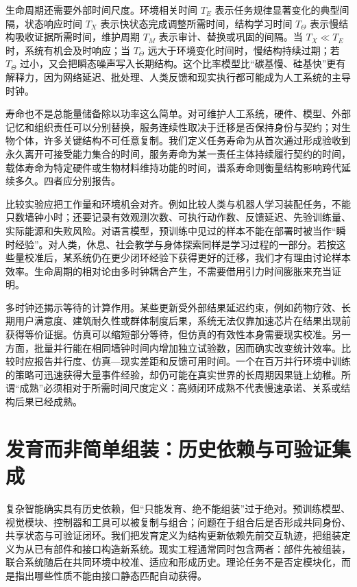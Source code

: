 生命周期还需要外部时间尺度。环境相关时间 $T_E$ 表示任务规律显著变化的典型间隔，状态响应时间 $T_X$ 表示快状态完成调整所需时间，结构学习时间 $T_\Theta$ 表示慢结构吸收证据所需时间，维护周期 $T_M$ 表示审计、替换或巩固的间隔。当 $T_X\ll T_E$ 时，系统有机会及时响应；当 $T_\Theta$ 远大于环境变化时间时，慢结构持续过期；若 $T_\Theta$ 过小，又会把瞬态噪声写入长期结构。这个比率模型比“碳基慢、硅基快”更有解释力，因为网络延迟、批处理、人类反馈和现实执行都可能成为人工系统的主导时钟。

寿命也不是总能量储备除以功率这么简单。对可维护人工系统，硬件、模型、外部记忆和组织责任可以分别替换，服务连续性取决于迁移是否保持身份与契约；对生物个体，许多关键结构不可任意复制。我们定义任务寿命为从首次通过形成验收到永久离开可接受能力集合的时间，服务寿命为某一责任主体持续履行契约的时间，载体寿命为特定硬件或生物材料维持功能的时间，谱系寿命则衡量结构影响跨代延续多久。四者应分别报告。

比较实验应把工作量和环境机会对齐。例如比较人类与机器人学习装配任务，不能只数墙钟小时；还要记录有效观测次数、可执行动作数、反馈延迟、先验训练量、实际能源和失败风险。对语言模型，预训练中见过的样本不能在部署时被当作“瞬时经验”。对人类，休息、社会教学与身体探索同样是学习过程的一部分。若按这些量校准后，某系统仍在更少闭环经验下获得更好的迁移，我们才有理由讨论样本效率。生命周期的相对论由多时钟耦合产生，不需要借用引力时间膨胀来充当证明。

多时钟还揭示等待的计算作用。某些更新受外部结果延迟约束，例如药物疗效、长期用户满意度、建筑耐久性或群体制度后果，系统无法仅靠加速芯片在结果出现前获得等价证据。仿真可以缩短部分等待，但仿真的有效性本身需要现实校准。另一方面，批量并行能在相同墙钟时间内增加独立试验数，因而确实改变统计效率。比较时应报告并行度、仿真—现实差距和反馈可用时间。一个在百万并行环境中训练的策略可迅速获得大量事件经验，却仍可能在真实世界的长周期因果链上幼稚。所谓“成熟”必须相对于所需时间尺度定义：高频闭环成熟不代表慢速承诺、关系或结构后果已经成熟。

\section{发育而非简单组装：历史依赖与可验证集成}
\label{sec:system_development_not_manufactured}

复杂智能确实具有历史依赖，但“只能发育、绝不能组装”过于绝对。预训练模型、视觉模块、控制器和工具可以被复制与组合；问题在于组合后是否形成共同身份、共享状态与可验证闭环。我们把发育定义为结构更新依赖先前交互轨迹，把组装定义为从已有部件和接口构造新系统。现实工程通常同时包含两者：部件先被组装，联合系统随后在共同环境中校准、适应和形成历史。理论任务不是否定模块化，而是指出哪些性质不能由接口静态匹配自动获得。

